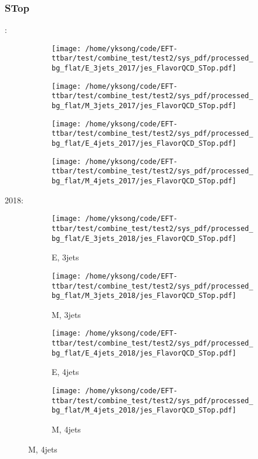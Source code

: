 \documentclass{beamer}
\begin{document}
\begin{frame}
\frametitle{STop}
\fontsize{5}{1}:
\begin{figure}
\centering
\begin{subfigure}[b]{0.24\textwidth}
\texttt{[image: /home/yksong/code/EFT-ttbar/test/combine\_test/test2/sys\_pdf/processed\_bg\_flat/E\_3jets\_2017/jes\_FlavorQCD\_STop.pdf]}
\end{subfigure}
\begin{subfigure}[b]{0.24\textwidth}
\texttt{[image: /home/yksong/code/EFT-ttbar/test/combine\_test/test2/sys\_pdf/processed\_bg\_flat/M\_3jets\_2017/jes\_FlavorQCD\_STop.pdf]}
\end{subfigure}
\begin{subfigure}[b]{0.24\textwidth}
\texttt{[image: /home/yksong/code/EFT-ttbar/test/combine\_test/test2/sys\_pdf/processed\_bg\_flat/E\_4jets\_2017/jes\_FlavorQCD\_STop.pdf]}
\end{subfigure}
\begin{subfigure}[b]{0.24\textwidth}
\texttt{[image: /home/yksong/code/EFT-ttbar/test/combine\_test/test2/sys\_pdf/processed\_bg\_flat/M\_4jets\_2017/jes\_FlavorQCD\_STop.pdf]}
\end{subfigure}
\end{figure}
2018:
\begin{figure}
\centering
\begin{subfigure}[b]{0.24\textwidth}
\texttt{[image: /home/yksong/code/EFT-ttbar/test/combine\_test/test2/sys\_pdf/processed\_bg\_flat/E\_3jets\_2018/jes\_FlavorQCD\_STop.pdf]}
\captionsetup{font=tiny}
\caption{E, 3jets}
\end{subfigure}
\begin{subfigure}[b]{0.24\textwidth}
\texttt{[image: /home/yksong/code/EFT-ttbar/test/combine\_test/test2/sys\_pdf/processed\_bg\_flat/M\_3jets\_2018/jes\_FlavorQCD\_STop.pdf]}
\captionsetup{font=tiny}
\caption{M, 3jets}
\end{subfigure}
\begin{subfigure}[b]{0.24\textwidth}
\texttt{[image: /home/yksong/code/EFT-ttbar/test/combine\_test/test2/sys\_pdf/processed\_bg\_flat/E\_4jets\_2018/jes\_FlavorQCD\_STop.pdf]}
\captionsetup{font=tiny}
\caption{E, 4jets}
\end{subfigure}
\begin{subfigure}[b]{0.24\textwidth}
\texttt{[image: /home/yksong/code/EFT-ttbar/test/combine\_test/test2/sys\_pdf/processed\_bg\_flat/M\_4jets\_2018/jes\_FlavorQCD\_STop.pdf]}
\captionsetup{font=tiny}
\caption{M, 4jets}
\end{subfigure}
\end{figure}
\end{frame}
\end{document}
